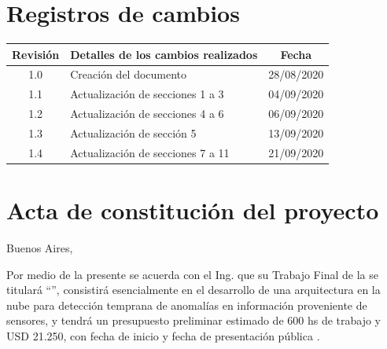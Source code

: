 \documentclass[11pt]{charter}
\begin{document}
\maketitle
\thispagestyle{empty}
\pagebreak


\thispagestyle{empty}
{\setlength{\parskip}{0pt}
\tableofcontents{}
}
\pagebreak


\section{Registros de cambios}
\label{sec:registro}


\begin{table}[ht]
\label{tab:registro}
\centering
\begin{tabularx}{\linewidth}{@{}|c|X|c|@{}}
\hline
\rowcolor[HTML]{C0C0C0} 
Revisión & \multicolumn{1}{c|}{\cellcolor[HTML]{C0C0C0}Detalles de los cambios realizados} & Fecha      \\ \hline
1.0      & Creación del documento                                          & 28/08/2020 \\ \hline
1.1      &  Actualización de secciones 1 a 3                           & 04/09/2020 \\ \hline
1.2      & Actualización de secciones 4 a 6                            & 06/09/2020 \\ \hline
1.3      & Actualización de sección 5                            & 13/09/2020 \\ \hline
1.4      & Actualización de secciones 7 a 11                            & 21/09/2020 \\ \hline
\end{tabularx}
\end{table}

\pagebreak



\section{Acta de constitución del proyecto}
\label{sec:acta}

\begin{flushright}
Buenos Aires, \fechaInicioName
\end{flushright}

\vspace{2cm}

Por medio de la presente se acuerda con el Ing. \authorname\hspace{1px} que su Trabajo Final de la \degreename\hspace{1px} se titulará ``\ttitle'', consistirá esencialmente en el desarrollo de una arquitectura en la nube para detección temprana de anomalías en información proveniente de sensores, y tendrá un presupuesto preliminar estimado de 600 hs de trabajo y USD 21.250, con fecha de inicio \fechaInicioName\hspace{1px} y fecha de presentación pública \fechaFinalName.
\end{document}
